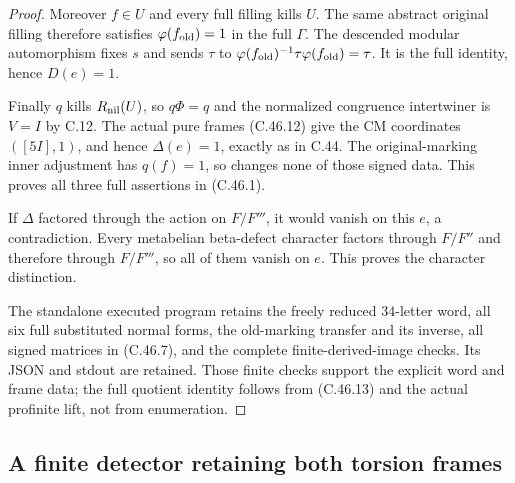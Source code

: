 \begin{proof}
Moreover $f\in U$ and every full filling kills $U$.
The same abstract original filling therefore satisfies
$\varphi(f_{\rm old})=1$ in the full $\Gamma$. The descended
modular automorphism fixes $s$ and sends $\tau$ to
$\varphi(f_{\rm old})^{-1}\tau\varphi(f_{\rm old})=\tau$.
It is the full identity, hence $D(e)=1$.

Finally $q$ kills $R_{\rm nil}(U)$, so $q\Phi=q$ and the
normalized congruence intertwiner is $V=I$ by C.12. The actual
pure frames (C.46.12) give the CM coordinates $([5I],1)$,
and hence $\Delta(e)=1$, exactly as in C.44. The original-marking
inner adjustment has $q(f)=1$, so changes none of those signed data.
This proves all three full assertions in (C.46.1).

If $\Delta$ factored through the action on $F/F'''$, it would
vanish on this $e$, a contradiction. Every metabelian beta-defect
character factors through $F/F''$ and therefore through $F/F'''$,
so all of them vanish on $e$. This proves the character distinction.

The standalone executed program
retains the freely reduced $34$-letter word, all six full substituted
normal forms, the old-marking transfer and its inverse, all signed
matrices in (C.46.7), and the complete finite-derived-image checks.
Its JSON and stdout are retained. Those finite checks support the
explicit word and frame data; the full quotient identity follows
from (C.46.13) and the actual profinite lift, not from enumeration.
\end{proof}


\subsection{A finite detector retaining both torsion frames}

